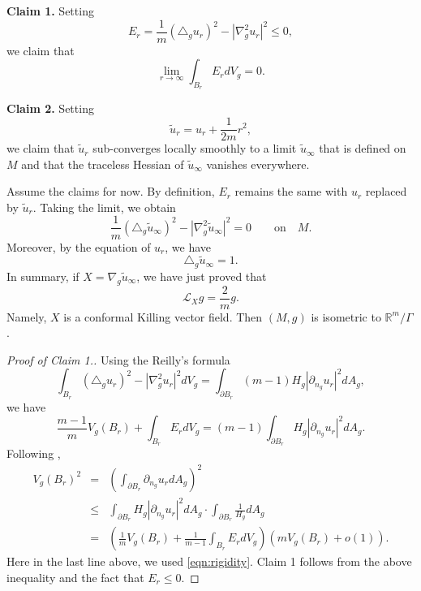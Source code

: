\documentclass{amsart}
\newcommand{\abs}[1]{\left\vert#1\right\vert}
\newcommand{\Real}{\mathbb R}
\numberwithin{equation}{section}
\begin{document}
{\bf Claim 1.} Setting
\[
	E_r= \frac{1}{m}(\triangle_g u_r)^2 - \abs{\nabla_g^2 u_r}^2 \leq 0, 
\]
we claim that
\[
	\lim_{r\to \infty } \int_{B_r} E_r dV_g = 0.
\]

{\bf Claim 2.} Setting
\[
	\tilde{u}_r= u_r + \frac{1}{2m}r^2,
\]
we claim that $\tilde{u}_r$ sub-converges locally smoothly to a limit $\tilde{u}_\infty $ that is defined on $M$ and that the traceless Hessian of $\tilde{u}_\infty $ vanishes everywhere.

Assume the claims for now. By definition, $E_r$ remains the same with $u_r$ replaced by $\tilde{u}_r$. Taking the limit, we obtain
\[
	\frac{1}{m}(\triangle_g \tilde{u}_\infty )^2 - \abs{\nabla_g^2 \tilde{u}_\infty }^2 =0 \qquad \text{on} \quad M.
\]
Moreover, by the equation of $u_r$, we have
\[
	\triangle_g \tilde{u}_\infty =1.
\]
In summary, if $X=\nabla_g \tilde{u}_\infty $, we have just proved that
\[
	\mathcal L_X g = \frac{2}{m}g.
	\]
	Namely, $X$ is a conformal Killing vector field. Then $(M,g)$ is isometric to $\Real^m/\Gamma$.

\begin{proof}
	[Proof of Claim 1.] 
	Using the Reilly's formula
	\[
		\int_{B_r} (\triangle_g u_r)^2 - \abs{\nabla_g^2 u_r}^2 dV_g = \int_{\partial B_r} (m-1) H_g \abs{\partial_{n_g} u_r}^2 dA_g,
	\]
	we have
	\[
		\frac{m-1}{m} V_g(B_r)	+ \int_{B_r} E_r dV_g = (m-1) \int_{\partial B_r} H_g \abs{\partial_{n_g} u_r}^2 dA_g.
	\]
	Following \cite{ros1987},
	\begin{eqnarray*}
		V_g(B_r)^2 &=& \left( \int_{\partial B_r} \partial_{n_g} u_r dA_g \right)^2 \\
			   &\leq& \int_{\partial B_r} H_g \abs{\partial_{n_g} u_r}^2 dA_g \cdot \int_{\partial B_r} \frac{1}{H_g} dA_g \\
			   &=& \left( \frac{1}{m} V_g(B_r) + \frac{1}{m-1}\int_{B_r} E_r dV_g \right) \left( m V_g(B_r) + o(1) \right).
	\end{eqnarray*}
	Here in the last line above, we used \eqref{eqn:rigidity}.
	Claim 1 follows from the above inequality and the fact that $E_r\leq 0$.
\end{proof}
\end{document}
